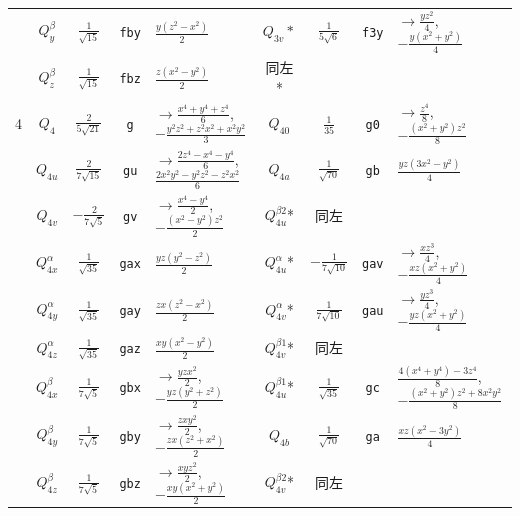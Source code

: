 \documentclass[11pt]{easymemo}
\begin{document}
\begin{table}[ht!]
\begin{center}
\begin{tabular}{c||c|c|c|l||c|c|c|l}
  & $Q_y^\beta$ & $\frac{1}{\sqrt{15}}$ & \texttt{fby} & $ \frac{y(z^2-x^2)}{2}$ &
$Q_{3v}*$ & $\frac{1}{5\sqrt{6}}$ & \texttt{f3y} & $\to\frac{yz^2}{4}$, $-\frac{y(x^2+y^2)}{4}$ \\
  & $Q_z^\beta$ & $\frac{1}{\sqrt{15}}$ & \texttt{fbz} & $ \frac{z(x^2-y^2)}{2}$ & 同左* & & & \\
 \hline
4 & $Q_4$ & $\frac{2}{5\sqrt{21}}$ & \texttt{g} & $\to\frac{x^{4}+y^4+z^4}{6}$, $-\frac{y^2z^2+z^2x^2+x^2y^2}{3}$ &
$Q_{40}$ & $\frac{1}{35}$ & \texttt{g0} & $\to\frac{z^4}{8}$, $-\frac{(x^2+y^2)z^2}{8}$ \\
  & $Q_{4u}$ & $\frac{2}{7\sqrt{15}}$ & \texttt{gu} & $\to\frac{2z^4-x^4-y^4}{6}$, $\frac{2x^2y^2-y^2z^2-z^2x^2}{6}$ &
$Q_{4a}$ & $\frac{1}{\sqrt{70}}$ & \texttt{gb} & $\frac{yz(3x^{2}-y^{2})}{4}$ \\
  & $Q_{4v}$ & $-\frac{2}{7\sqrt{5}}$ & \texttt{gv} & $\to\frac{x^4-y^4}{2}$, $-\frac{(x^2-y^2)z^2}{2}$ &
$Q_{4u}^{\beta2}$* & 同左 & & \\
  & $Q_{4x}^\alpha$ & $\frac{1}{\sqrt{35}}$ & \texttt{gax} & $ \frac{yz(y^2-z^2)}{2} $ &
$Q_{4u}^\alpha$* & $-\frac{1}{7\sqrt{10}}$ & \texttt{gav} & $\to\frac{xz^3}{4}$, $-\frac{xz(x^2+y^2)}{4}$ \\
  &$ Q_{4y}^\alpha$ & $\frac{1}{\sqrt{35}}$ & \texttt{gay} & $\frac{zx(z^2-x^2)}{2} $ &
$Q_{4v}^\alpha$* & $\frac{1}{7\sqrt{10}}$ & \texttt{gau} & $\to\frac{yz^3}{4}$, $-\frac{yz(x^2+y^2)}{4}$ \\
  & $Q_{4z}^\alpha$ & $\frac{1}{\sqrt{35}}$ & \texttt{gaz} & $\frac{xy(x^2-y^2)}{2} $ &
$Q_{4v}^{\beta1}$* & 同左 & & \\
  & $Q_{4x}^\beta$ & $\frac{1}{7\sqrt{5}}$ & \texttt{gbx} & $\to\frac{yzx^2}{2}$, $-\frac{yz(y^2+z^2)}{2}$ &
$Q_{4u}^{\beta1}$* & $\frac{1}{\sqrt{35}}$ & \texttt{gc} & $\frac{4(x^4+y^4)-3z^4}{8}$, $-\frac{(x^2+y^2)z^2+8x^2y^2}{8}$ \\
  & $Q_{4y}^\beta$ & $\frac{1}{7\sqrt{5}}$ & \texttt{gby} & $\to\frac{zxy^2}{2}$, $-\frac{zx(z^2+x^2)}{2}$ &
$Q_{4b}$ & $\frac{1}{\sqrt{70}}$ & \texttt{ga} & $\frac{xz(x^{2}-3y^{2})}{4}$ \\
  & $Q_{4z}^\beta$ & $\frac{1}{7\sqrt{5}}$ & \texttt{gbz} & $\to\frac{xyz^2}{2}$, $-\frac{xy(x^2+y^2)}{2}$ &
$Q_{4v}^{\beta2}$* & 同左 & & \\
 \hline \hline
\end{tabular}
\end{center}
\end{table}


\newpage
\appendix
\end{document}
